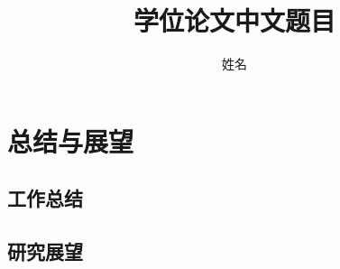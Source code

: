 \documentclass[master]{hdu-thesis}
\title{学位论文中文题目}{Thesis Title in English}%
\author{姓名}{Name}%
\begin{document}
\makecover
\makedeclaration




\figurelist

\tablelist

\tableofcontents





 



\chapter{总结与展望}

\section{工作总结}

\section{研究展望}

 



\end{document}
